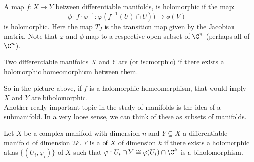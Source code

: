 \begin{center}
\end{center}

\vspace{.5cm}

A map $f: X \to Y$ between differentiable manifolds, is holomorphic if the map:
\begin{equation*}
    \phi \cdot f \cdot \varphi^{-1}: \varphi(f^{-1}(U)\cap U)) \to \phi(V)
\end{equation*}
is holomorphic. Here the map $T_J$ is the transition map given by the Jacobian matrix.
Note that $\varphi$ and $\phi$ map to a respective open subset of $\C^n$ (perhaps all of $\C^n$).
\begin{definition}
Two differentiable manifolds $X$ and $Y$ are 
(or isomorphic) if there exists a holomorphic homeomorphism between them.
\end{definition}

So in the picture above, if $f$ is a holomorphic homeomorphism, that would imply
$X$ and $Y$ are biholomorphic.\\

Another really important topic in the study of manifolds is the idea of a submanifold.
In a very loose sense, we can think of these as subsets of manifolds.

\begin{definition}
    Let $X$ be a complex manifold with dimension $n$ and $Y \subseteq X$ a differentiable
    manifold of dimension $2k$. $Y$ is a  of $X$ of dimension
    $k$ if there exists a holomorphic atlas $\{ ( U_i, \varphi_i )\}$ of $X$ such
    that $\varphi: U_i \cap Y \cong \varphi(U_i) \cap \C^k$ is a biholomorphism.
\end{definition}

